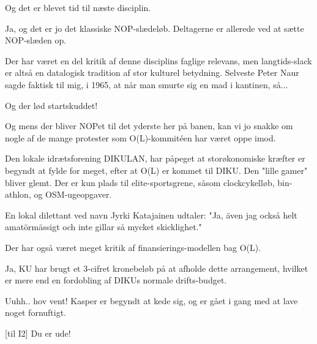 \documentclass[a4paper,11pt]{article}
\begin{document}
\begin{sketch}
   Og det er blevet tid til næste disciplin.


   Ja, og det er jo det klassiske NOP-slædeløb.  Deltagerne
  er allerede ved at sætte NOP-slæden op.


   Der har været en del kritik af denne disciplins faglige
  relevans, men langtids-slack er altså en datalogisk tradition af
  stor kulturel betydning.  Selveste Peter Naur sagde faktisk til mig,
  i 1965, at når man smurte sig en mad i kantinen, så...


   Og der lød startskuddet!


   Og mens der bliver NOPet til det yderste her på banen, kan vi jo
  snakke om nogle af de mange protester som O(L)-kommitéen har været
  oppe imod.

   Den lokale idrætsforening DIKULAN, har påpeget at
  storøkonomiske kræfter er begyndt at fylde for meget, efter at O(L)
  er kommet til DIKU. Den "lille gamer" bliver glemt. Der er kun plads
  til elite-sportsgrene, såsom clockcykelløb, bin-athlon, og
  OSM-ugeopgaver.

   En lokal dilettant ved navn Jyrki Katajainen udtaler: "Ja, även
  jag också helt amatörmässigt och inte gillar så mycket skicklighet."


   Der har også været meget kritik af finansierings-modellen bag O(L).

   Ja, KU har brugt et 3-cifret kronebeløb på at afholde dette
  arrangement, hvilket er mere end en fordobling af DIKUs normale
  drifts-budget.


   Uuhh.. hov vent! Kasper er begyndt at kede sig, og er gået
  i gang med at lave noget fornuftigt.

  [til I2] Du er ude!



\end{sketch}
\end{document}
